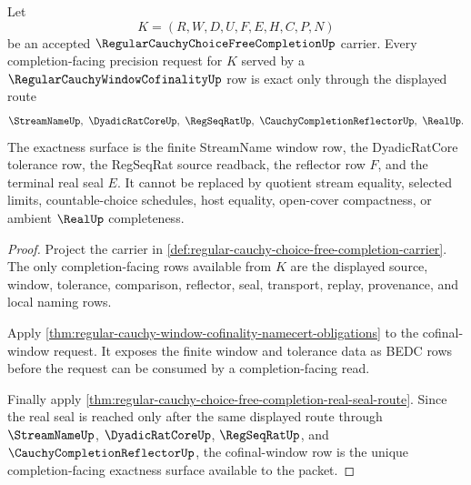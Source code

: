 \begin{theorem}
\label{thm:regular-cauchy-choice-free-completion-cofinal-window-exactness}
Let
$$
K=(R,W,D,U,F,E,H,C,P,N)
$$
be an accepted $\RegularCauchyChoiceFreeCompletionUp$ carrier. Every completion-facing precision request for $K$ served by a $\RegularCauchyWindowCofinalityUp$ row is exact only through the displayed route
$$
\StreamNameUp,\ \DyadicRatCoreUp,\ \RegSeqRatUp,\ \CauchyCompletionReflectorUp,\ \RealUp .
$$
The exactness surface is the finite StreamName window row, the DyadicRatCore tolerance row, the RegSeqRat source readback, the reflector row $F$, and the terminal real seal $E$. It cannot be replaced by quotient stream equality, selected limits, countable-choice schedules, host equality, open-cover compactness, or ambient $\RealUp$ completeness.
\end{theorem}
\begin{proof}
Project the carrier in \autoref{def:regular-cauchy-choice-free-completion-carrier}. The only completion-facing rows available from $K$ are the displayed source, window, tolerance, comparison, reflector, seal, transport, replay, provenance, and local naming rows.

Apply \autoref{thm:regular-cauchy-window-cofinality-namecert-obligations} to the cofinal-window request. It exposes the finite window and tolerance data as BEDC rows before the request can be consumed by a completion-facing read.

Finally apply \autoref{thm:regular-cauchy-choice-free-completion-real-seal-route}. Since the real seal is reached only after the same displayed route through $\StreamNameUp$, $\DyadicRatCoreUp$, $\RegSeqRatUp$, and $\CauchyCompletionReflectorUp$, the cofinal-window row is the unique completion-facing exactness surface available to the packet.
\end{proof}

